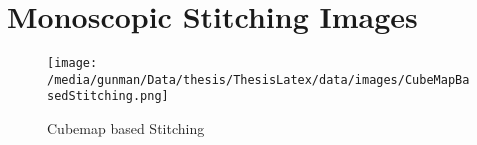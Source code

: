 \chapter{Monoscopic Stitching Images}



\begin{figure}[h]
	\begin{center}
		\texttt{[image: /media/gunman/Data/thesis/ThesisLatex/data/images/CubeMapBasedStitching.png]}
		\caption{Cubemap based Stitching} %
		\label{ODS_Input_Output}
	\end{center}
	\vspace{-0.3in}
\end{figure} 






